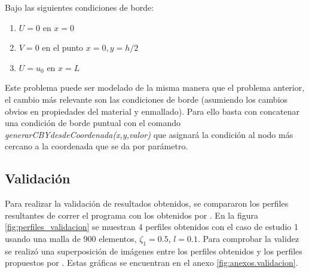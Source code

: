 \begin{enumerate}
		Bajo las siguientes condiciones de borde:
		\begin{enumerate}
			\item[] $U = 0$ en $x=0$
			\item[] $V = 0$ en el punto $x=0,y=h/2$
			\item[] $U = u_0$ en $x=L$
		\end{enumerate}

		Este problema puede ser modelado de la misma manera que el problema anterior, el cambio más relevante son las condiciones de borde (asumiendo los cambios obvios en propiedades del material y enmallado). Para ello basta con concatenar una condición de borde puntual con el comando \textit{generarCBYdesdeCoordenada(x,y,valor)} que asignará la condición al nodo más cercano a la coordenada que se da por parámetro.

	\end{enumerate}
	\subsection{Validación}
	\label{sub:validacion}

	Para realizar la validación de resultados obtenidos, se compararon los perfiles resultantes de correr el programa con los obtenidos por \textcite{Pisano2009}. En la figura \ref{fig:perfiles_validacion} se muestran 4 perfiles obtenidos con el caso de estudio 1 usando una malla de 900 elementos, $\zeta_1=0.5$, $l=0.1$. Para comprobar la validez se realizó una superposición de imágenes entre los perfiles obtenidos y los perfiles propuestos por \textcite{Pisano2009}. Estas gráficas se encuentran en el anexo \ref{fig:anexos.validacion}.

